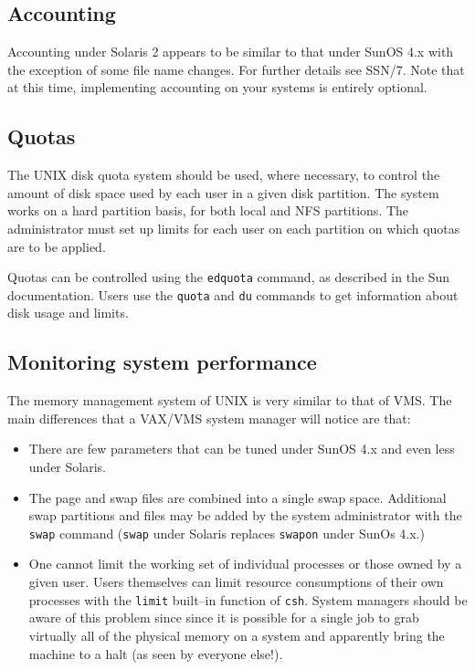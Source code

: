 \subsection{Accounting}

Accounting under Solaris 2 appears to be similar to that under SunOS 4.x
with the exception of some file name changes.
For further details see SSN/7. Note that at this time, implementing
accounting on your systems is entirely optional. 

\subsection{Quotas}

The UNIX disk quota system should be used, where necessary, to control the
amount of disk space used by each user in a given disk partition. The system 
works on a hard partition basis, for both local and NFS partitions. The
administrator must set up limits for each user on each partition on which
quotas are to be applied.

Quotas can be controlled using the {\tt edquota} command, as described in the
Sun documentation. Users use the {\tt quota} and {\tt du} commands to get
information about disk usage and limits.

\subsection{Monitoring system performance} 

The memory management system of UNIX is very similar to that of VMS. The main
differences that a VAX/VMS system manager will notice are that:

\begin{itemize}

\item There are few parameters that can be tuned under SunOS 4.x
and even less under Solaris. 

\item The page and swap files are combined into a single swap space. Additional
swap partitions and files may be added by the system administrator with the 
{\tt swap} command ({\tt swap} under Solaris replaces {\tt swapon} under
SunOs 4.x.)

\item One cannot limit the working set of individual processes or those owned
by a given user. Users themselves can limit resource consumptions of their
own processes with the {\tt limit} built--in function of {\tt csh}. System
managers should be aware of this problem since since it is possible for
a single job to grab virtually all of the physical memory on a system and
apparently bring the machine to a halt (as seen by everyone else!). 

\end {itemize}

